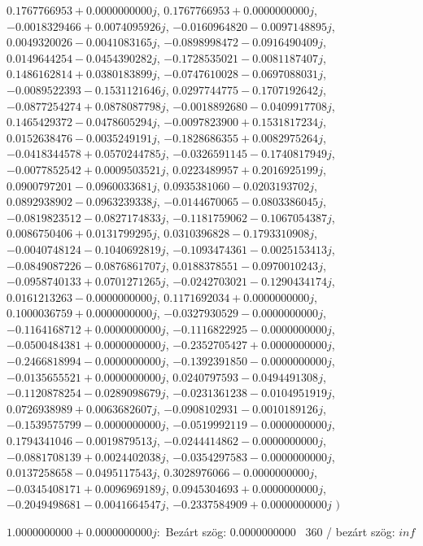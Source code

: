 \documentclass[14pt,a4paper]{article}
\begin{document}
\begin{itemize}
$0.1767766953+0.0000000000j$, $0.1767766953+0.0000000000j$, $-0.0018329466+0.0074095926j$, $-0.0160964820-0.0097148895j$, $0.0049320026-0.0041083165j$, $-0.0898998472-0.0916490409j$, $0.0149644254-0.0454390282j$, $-0.1728535021-0.0081187407j$, $0.1486162814+0.0380183899j$, $-0.0747610028-0.0697088031j$, $-0.0089522393-0.1531121646j$, $0.0297744775-0.1707192642j$, $-0.0877254274+0.0878087798j$, $-0.0018892680-0.0409917708j$, $0.1465429372-0.0478605294j$, $-0.0097823900+0.1531817234j$, $0.0152638476-0.0035249191j$, $-0.1828686355+0.0082975264j$, $-0.0418344578+0.0570244785j$, $-0.0326591145-0.1740817949j$, $-0.0077852542+0.0009503521j$, $0.0223489957+0.2016925199j$, $0.0900797201-0.0960033681j$, $0.0935381060-0.0203193702j$, $0.0892938902-0.0963239338j$, $-0.0144670065-0.0803386045j$, $-0.0819823512-0.0827174833j$, $-0.1181759062-0.1067054387j$, $0.0086750406+0.0131799295j$, $0.0310396828-0.1793310908j$, $-0.0040748124-0.1040692819j$, $-0.1093474361-0.0025153413j$, $-0.0849087226-0.0876861707j$, $0.0188378551-0.0970010243j$, $-0.0958740133+0.0701271265j$, $-0.0242703021-0.1290434174j$, $0.0161213263-0.0000000000j$, $0.1171692034+0.0000000000j$, $0.1000036759+0.0000000000j$, $-0.0327930529-0.0000000000j$, $-0.1164168712+0.0000000000j$, $-0.1116822925-0.0000000000j$, $-0.0500484381+0.0000000000j$, $-0.2352705427+0.0000000000j$, $-0.2466818994-0.0000000000j$, $-0.1392391850-0.0000000000j$, $-0.0135655521+0.0000000000j$, $0.0240797593-0.0494491308j$, $-0.1120878254-0.0289098679j$, $-0.0231361238-0.0104951919j$, $0.0726938989+0.0063682607j$, $-0.0908102931-0.0010189126j$, $-0.1539575799-0.0000000000j$, $-0.0519992119-0.0000000000j$, $0.1794341046-0.0019879513j$, $-0.0244414862-0.0000000000j$, $-0.0881708139+0.0024402038j$, $-0.0354297583-0.0000000000j$, $0.0137258658-0.0495117543j$, $0.3028976066-0.0000000000j$, $-0.0345408171+0.0096969189j$, $0.0945304693+0.0000000000j$, $-0.2049498681-0.0041664547j$, $-0.2337584909+0.0000000000j$
$\big)$
\end{itemize}
$1.0000000000+0.0000000000j$:\
Bezárt szög: $0.0000000000$ \
360 / bezárt szög: $inf$\
\end{document}
